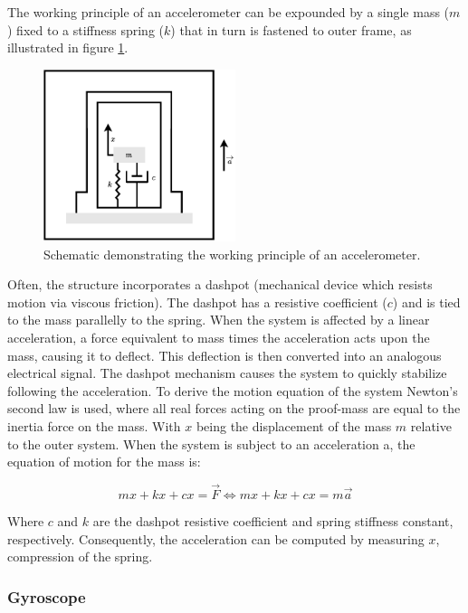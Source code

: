 The working principle of an accelerometer can be expounded by a single mass ($m$) fixed to a stiffness spring ($k$) that in turn is fastened to outer frame, as illustrated in figure \ref{fig:accelerometer_schematic}.

\begin{figure}[!h]
    \centering
    \includegraphics[width=0.5\textwidth]{figures/accelerometer.pdf}
    \caption{Schematic demonstrating the working principle of an accelerometer. }
    \label{fig:accelerometer_schematic}
\end{figure}

Often, the structure incorporates a dashpot (mechanical device which resists motion via viscous friction). The dashpot has a resistive coefficient ($c$) and is tied to the mass parallelly to the spring. When the system is affected by a linear acceleration, a force equivalent to mass times the acceleration acts upon the mass, causing it to deflect. This deflection is then converted into an analogous electrical signal. The dashpot mechanism causes the system to quickly stabilize following the acceleration. To derive the motion equation of the system Newton's second law is used, where all real forces acting on the proof-mass are equal to the inertia force on the mass. With $x$ being the displacement of the mass $m$ relative to the outer system. When the system is subject to an acceleration a, the equation of motion for the mass is:

\begin{equation}
    mx + kx + cx = \overrightarrow{F}\Leftrightarrow mx + kx + cx = m\overrightarrow{a}
\end{equation}

Where $c$ and $k$ are the dashpot resistive coefficient and spring stiffness constant, respectively. Consequently, the acceleration can be computed by measuring $x$, compression of the spring.


\subsubsection{Gyroscope}

